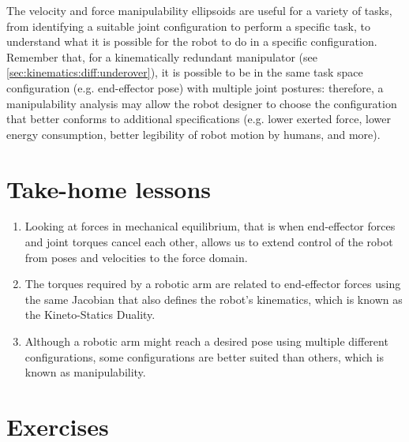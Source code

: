 The velocity and force manipulability ellipsoids are useful for a variety of tasks, from identifying a suitable joint configuration to perform a specific task, to understand what it is possible for the robot to do in a specific configuration. Remember that, for a kinematically redundant manipulator (see \cref{sec:kinematics:diff:underover}), it is possible to be in the same task space configuration (e.g. end-effector pose) with multiple joint postures: therefore, a manipulability analysis may allow the robot designer to choose the configuration that better conforms to additional specifications (e.g. lower exerted force, lower energy consumption, better legibility of robot motion by humans, and more).




\section*{Take-home lessons}
\begin{enumerate}
\item Looking at forces in mechanical equilibrium, that is when end-effector forces and joint torques cancel each other, allows us to extend control of the robot from poses and velocities to the force domain.
\item The torques required by a robotic arm are related to end-effector forces using the same Jacobian that also defines the robot’s kinematics, which is known as the Kineto-Statics Duality.  
\item Although a robotic arm might reach a desired pose using multiple different configurations, some configurations are better suited than others, which is known as manipulability.
\end{enumerate}

\section*{Exercises}\small

